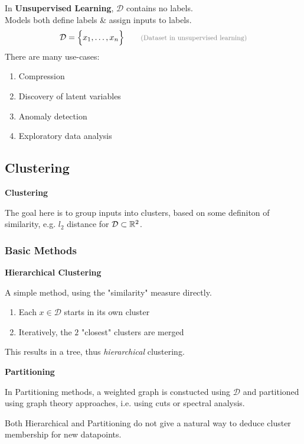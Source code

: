 In \textbf{Unsupervised Learning}, $\mathcal{D}$ contains no labels.\\
Models both define labels \& assign inputs to labels.
$$
    \mathcal{D} = \Bigl\{ x_1,\ldots,x_n \Bigr\}    \qquad      \text{\color{gray}\footnotesize(Dataset in unsupervised learning)}
$$
There are many use-cases:
\begin{enumerate}
    \item Compression
    \item Discovery of latent variables
    \item Anomaly detection
    \item Exploratory data analysis
\end{enumerate}

\subsection{Clustering}

 \textbf{Clustering}

The goal here is to group inputs into clusters, based on some definiton of similarity, e.g. $l_2$ distance for $\mathcal{D} \subset \mathbb{R}^2$.\\

\subsubsection{Basic Methods}

\method \textbf{Hierarchical Clustering}

A simple method, using the "similarity" measure directly.

\begin{enumerate}
    \item Each $x \in \mathcal{D}$ starts in its own cluster
    \item Iteratively, the $2$ "closest" clusters are merged
\end{enumerate}

This results in a tree, thus \textit{hierarchical} clustering.

\method \textbf{Partitioning}

In Partitioning methods, a weighted graph is constucted using $\mathcal{D}$ and partitioned using graph theory approaches, i.e. using cuts or spectral analysis.

{\footnotesize
    \remark Both Hierarchical and Partitioning do not give a natural way to deduce cluster membership for new datapoints.
}

